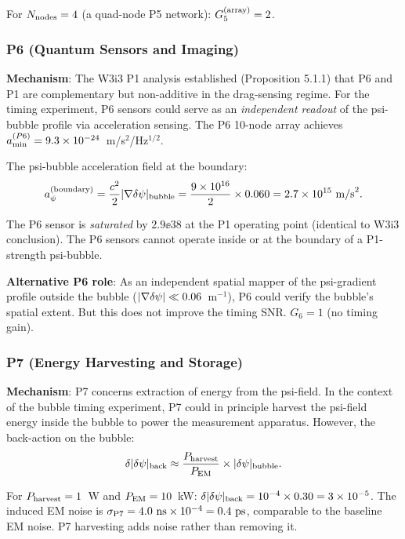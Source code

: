 For $N_{\rm nodes} = 4$ (a quad-node P5 network): $G_5^{(\rm array)} = 2$.

\subsubsection*{P6 (Quantum Sensors and Imaging)}

\textbf{Mechanism}: The W3i3 P1 analysis established (Proposition 5.1.1)
that P6 and P1 are complementary but non-additive in the drag-sensing regime.
For the timing experiment, P6 sensors could serve as an \emph{independent
readout} of the psi-bubble profile via acceleration sensing. The P6 10-node
array achieves $a_{\rm min}^{(P6)} = 9.3\times 10^{-24}$~m/s$^2$/Hz$^{1/2}$.

The psi-bubble acceleration field at the boundary:
\begin{equation}
a_\psi^{(\rm boundary)} = \frac{c^2}{2}|\nabla\delta\psi|_{\rm bubble}
= \frac{9\times 10^{16}}{2} \times 0.060 = 2.7\times 10^{15}~\text{m/s}^2.
\label{eq:bubble_accel}
\end{equation}

The P6 sensor is \emph{saturated} by $2.9\ee{38}$ at the P1 operating point
(identical to W3i3 conclusion). The P6 sensors cannot operate inside or at
the boundary of a P1-strength psi-bubble.

\textbf{Alternative P6 role}: As an independent spatial mapper of the
psi-gradient profile outside the bubble ($|\nabla\delta\psi| \ll 0.06$~m$^{-1}$),
P6 could verify the bubble's spatial extent. But this does not improve the
timing SNR. $G_6 = 1$ (no timing gain).

\subsubsection*{P7 (Energy Harvesting and Storage)}

\textbf{Mechanism}: P7 concerns extraction of energy from the psi-field. In
the context of the bubble timing experiment, P7 could in principle harvest
the psi-field energy inside the bubble to power the measurement apparatus.
However, the back-action on the bubble:
\begin{equation}
\delta|\delta\psi|_{\rm back} \approx \frac{P_{\rm harvest}}{P_{\rm EM}}
\times |\delta\psi|_{\rm bubble}.
\label{eq:P7_backaction}
\end{equation}

For $P_{\rm harvest} = 1$~W and $P_{\rm EM} = 10$~kW: $\delta|\delta\psi|_{\rm back}
= 10^{-4} \times 0.30 = 3\times 10^{-5}$. The induced EM noise is $\sigma_{\rm P7}
= 4.0~\text{ns} \times 10^{-4} = 0.4~\text{ps}$, comparable to the baseline
EM noise. P7 harvesting adds noise rather than removing it.

